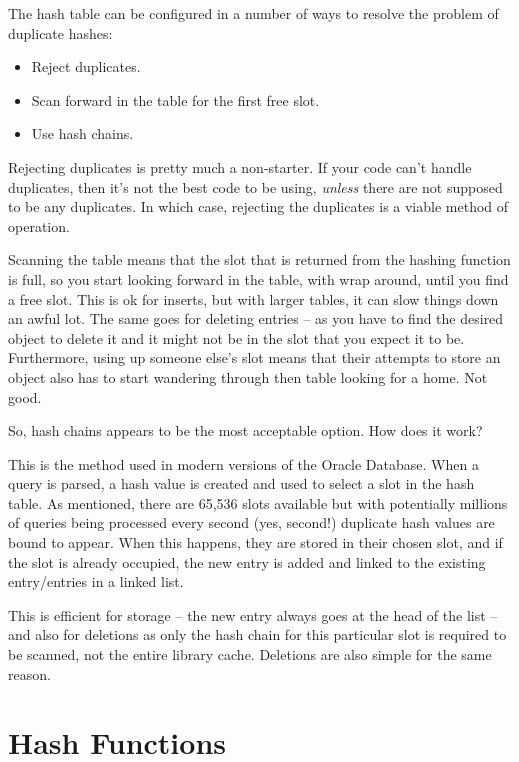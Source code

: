 The hash table can be configured in a number of ways to resolve the
problem of duplicate hashes:
\begin{itemize}
\item Reject duplicates.
\item Scan forward in the table for the first free slot.
\item Use hash chains.
\end{itemize}
Rejecting duplicates is pretty much a non-starter. If your code can't
handle duplicates, then it's not the best code to be using, \emph{unless}
there are not supposed to be any duplicates. In which case, rejecting
the duplicates is a viable method of operation. 

Scanning the table means that the slot that is returned from the hashing
function is full, so you start looking forward in the table, with
wrap around, until you find a free slot. This is ok for inserts, but
with larger tables, it can slow things down an awful lot. The same
goes for deleting entries -- as you have to find the desired object
to delete it and it might not be in the slot that you expect it to
be. Furthermore, using up someone else's slot means that their attempts
to store an object also has to start wandering through then table
looking for a home. Not good.

So, hash chains appears to be the most acceptable option. How does
it work?

This is the method used in modern versions of the Oracle Database.
When a query is parsed, a hash value is created and used to select
a slot in the hash table. As mentioned, there are 65,536 slots available
but with potentially millions of queries being processed every second
(yes, second!) duplicate hash values are bound to appear. When this
happens, they are stored in their chosen slot, and if the slot is
already occupied, the new entry is added and linked to the existing
entry/entries in a linked list.

This is efficient for storage -- the new entry always goes at the
head of the list -- and also for deletions as only the hash chain
for this particular slot is required to be scanned, not the entire
library cache. Deletions are also simple for the same reason.

\section{Hash Functions}

